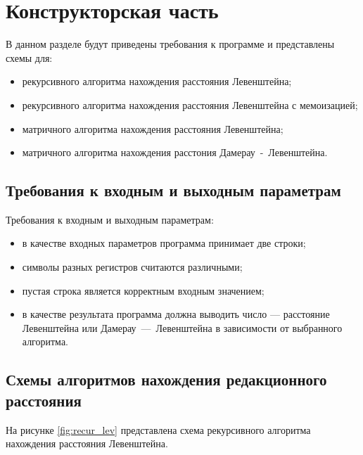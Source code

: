 \section{Конструкторская часть}

В данном разделе будут приведены требования к программе и представлены схемы для:
\begin{itemize}
    \item рекурсивного алгоритма нахождения расстояния Левенштейна;
    \item рекурсивного алгоритма нахождения расстояния Левенштейна с мемоизацией;
    \item матричного алгоритма нахождения расстояния Левенштейна;
    \item матричного алгоритма нахождения расстония Дамерау~-~Левенштейна.
\end{itemize}

\subsection{Требования к входным и выходным параметрам}

Требования к входным и выходным параметрам:
\begin{itemize}
    \item в качестве входных параметров программа принимает две строки;
    \item символы разных регистров считаются различными;
    \item пустая строка является корректным входным значением;
    \item в качестве результата программа должна выводить число --- расстояние Левенштейна или Дамерау~---~Левенштейна в зависимости от выбранного алгоритма.
\end{itemize}

\subsection{Схемы алгоритмов нахождения редакционного расстояния}

На рисунке \ref{fig:recur_lev} представлена схема рекурсивного алгоритма нахождения расстояния Левенштейна.

